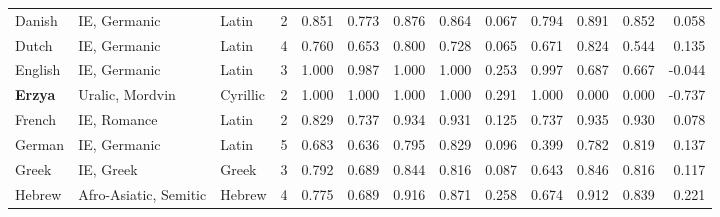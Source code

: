 \begin{tabular}{lllrrrrrrrrrr}
                         Danish &                    IE, Germanic &      Latin &         2 &                       0.851 &                         0.773 &         0.876 &                  0.864 &            0.067 &                         0.794 &         0.891 &                  0.852 &            0.058 \\
                          Dutch &                    IE, Germanic &      Latin &         4 &                       0.760 &                         0.653 &         0.800 &                  0.728 &            0.065 &                         0.671 &         0.824 &                  0.544 &            0.135 \\
                        English &                    IE, Germanic &      Latin &         3 &                       1.000 &                         0.987 &         1.000 &                  1.000 &            0.253 &                         0.997 &         0.687 &                  0.667 &           -0.044 \\
                 \textbf{Erzya} &                 Uralic, Mordvin &   Cyrillic &         2 &                       1.000 &                         1.000 &         1.000 &                  1.000 &            0.291 &                         1.000 &         0.000 &                  0.000 &           -0.737 \\
                         French &                     IE, Romance &      Latin &         2 &                       0.829 &                         0.737 &         0.934 &                  0.931 &            0.125 &                         0.737 &         0.935 &                  0.930 &            0.078 \\
                         German &                    IE, Germanic &      Latin &         5 &                       0.683 &                         0.636 &         0.795 &                  0.829 &            0.096 &                         0.399 &         0.782 &                  0.819 &            0.137 \\
                          Greek &                       IE, Greek &      Greek &         3 &                       0.792 &                         0.689 &         0.844 &                  0.816 &            0.087 &                         0.643 &         0.846 &                  0.816 &            0.117 \\
                         Hebrew &           Afro-Asiatic, Semitic &     Hebrew &         4 &                       0.775 &                         0.689 &         0.916 &                  0.871 &            0.258 &                         0.674 &         0.912 &                  0.839 &            0.221 \\

\end{tabular}
